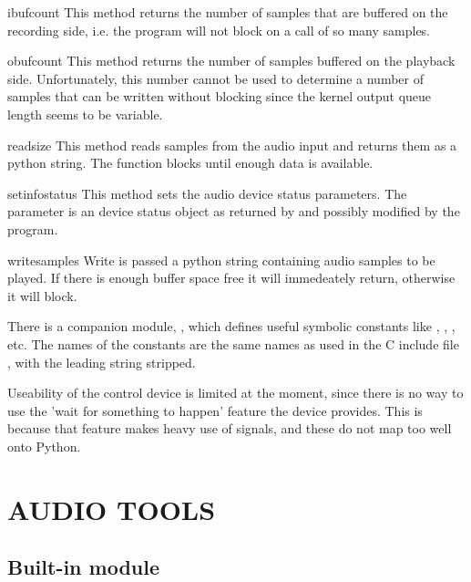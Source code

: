 \begin{funcdesc}{ibufcount}{}
This method returns the number of samples that are buffered on the
recording side, i.e.
the program will not block on a  call of so many samples.
\end{funcdesc}

\begin{funcdesc}{obufcount}{}
This method returns the number of samples buffered on the playback
side. Unfortunately, this number cannot be used to determine a number
of samples that can be written without blocking since the kernel
output queue length seems to be variable.
\end{funcdesc}

\begin{funcdesc}{read}{size}
This method reads  samples from the audio input and returns
them as a python string. The function blocks until enough data is available.
\end{funcdesc}

\begin{funcdesc}{setinfo}{status}
This method sets the audio device status parameters. The 
parameter is an device status object as returned by  and
possibly modified by the program.
\end{funcdesc}

\begin{funcdesc}{write}{samples}
Write is passed a python string containing audio samples to be played.
If there is enough buffer space free it will immedeately return,
otherwise it will block.
\end{funcdesc}

There is a companion module, , which defines useful
symbolic constants like , ,
, etc. The names of
the constants are the same names as used in the C include file
, with the leading string  stripped.

Useability of the control device is limited at the moment, since there
is no way to use the 'wait for something to happen' feature the device
provides. This is because that feature makes heavy use of signals, and
these do not map too well onto Python.

\chapter{AUDIO TOOLS}

\section{Built-in module }


